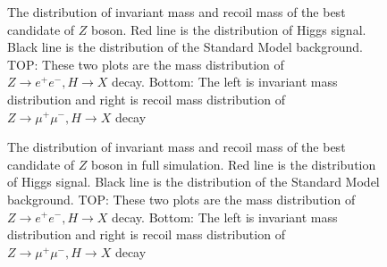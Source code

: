 \documentclass[11pt,a4paper]{cepcnote}
\begin{document}
\begin{figure}[H]
{		 \label{fig:uuHfilterRecMass}
	}
	\caption[]{The distribution of invariant mass and recoil mass of the best candidate of $Z$ boson. 
	Red line is the distribution of Higgs signal. Black line is the distribution of the Standard Model background.
	TOP: These two plots are the mass distribution of $Z\rightarrow e^+e^-, H\rightarrow X$ decay.
	Bottom: The left is invariant mass distribution and right is recoil mass distribution of $Z\rightarrow \mu^+\mu^-, H\rightarrow X$ decay}
	\label{fig:llHfilter}
\end{figure}
\begin{figure}[H]
	\centering
	\caption[]{The distribution of invariant mass and recoil mass of the best candidate of $Z$ boson in full simulation. 
	Red line is the distribution of Higgs signal. Black line is the distribution of the Standard Model background.
	TOP: These two plots are the mass distribution of $Z\rightarrow e^+e^-, H\rightarrow X$ decay.
	Bottom: The left is invariant mass distribution and right is recoil mass distribution of $Z\rightarrow \mu^+\mu^-, H\rightarrow X$ decay}
	\label{fig:llHfiltered}
\end{figure}
\end{document}

